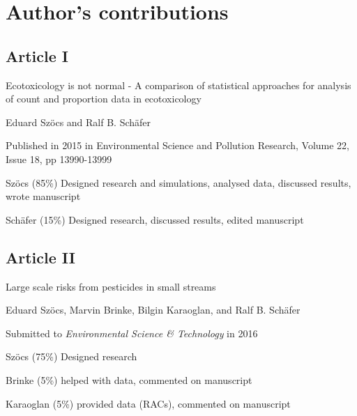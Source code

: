 

\chapter{Author's contributions}

\begin{sloppypar}
\vspace{-1em}
\section*{Article I}
\vspace{-1em}
\small
\begin{description}
    \setlength\itemsep{0em}
	\item[Title:] Ecotoxicology is not normal - A comparison of statistical approaches for analysis of count and proportion data in ecotoxicology
	\item[Authors:] Eduard Szöcs and Ralf B. Schäfer
	\item[Status:] Published in 2015 in Environmental Science and Pollution Research, Volume 22, Issue 18, pp 13990-13999
	\item[Contributions:] Szöcs (85\%) Designed research and simulations, analysed data, discussed results, wrote manuscript 

	Schäfer (15\%) Designed research, discussed results, edited manuscript
\end{description}
\normalsize

\vspace{-1em}
\section*{Article II}
\vspace{-1em}
\small
\begin{description}
    \setlength\itemsep{0em}
	\item[Title:] Large scale risks from pesticides in small streams
	\item[Authors:] Eduard Szöcs, Marvin Brinke, Bilgin Karaoglan, and Ralf B. Schäfer
	\item[Status:] Submitted to \emph{Environmental Science \& Technology} in 2016
	\item[Contributions:] Szöcs (75\%) Designed research

	Brinke (5\%) helped with data, commented on manuscript

	Karaoglan (5\%) provided data (RACs), commented on manuscript


\end{description}
\end{sloppypar}
